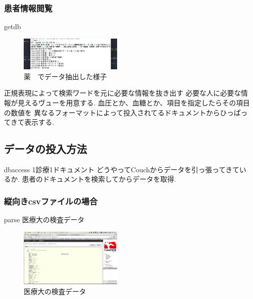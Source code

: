 	\subsubsection{患者情報閲覧}
		getdb
		\\
		\begin{figure}[htbp]
				\includegraphics[width=5cm, bb=0 0 437 688]{./gazou/getdb.png}
			\caption{薬　でデータ抽出した様子}
			\label{ss-mix_sampledata}
		\end{figure}
		正規表現によって検索ワードを元に必要な情報を抜き出す
		必要な人に必要な情報が見えるヴューを用意する.
		血圧とか、血糖とか、項目を指定したらその項目の数値を
		異なるフォーマットによって投入されてるドキュメントからひっぱってきて表示する.



\subsection{データの投入方法}
	dbaccess
	1診療1ドキュメント
	どうやってCouchからデータを引っ張ってきているか.
	患者のドキュメントを検索してからデータを取得.
		\subsubsection{縦向きcsvファイルの場合}
			parse
			医療大の検査データ
			\\
			\begin{figure}[htbp]
					\includegraphics[width=5cm, bb=0 0 437 688]{./gazou/kensa.png}
				\caption{医療大の検査データ}
				\label{ss-mix_sampledata}
			\end{figure}

